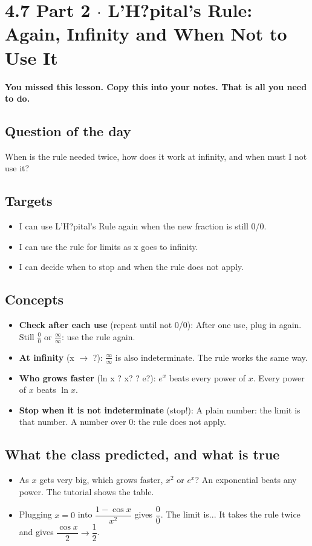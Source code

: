 \documentclass[11pt]{article}
\begin{document}
\section*{4.7 Part 2 $\cdot$ L'H?pital's Rule: Again, Infinity and When Not to Use It}
\textbf{You missed this lesson. Copy this into your notes. That is all you need to do.}\par\medskip
\subsection*{Question of the day}
When is the rule needed twice, how does it work at infinity, and when must I not use it?\par
\subsection*{Targets}\begin{itemize}\item I can use L'H?pital's Rule again when the new fraction is still 0/0.
\item I can use the rule for limits as x goes to infinity.
\item I can decide when to stop and when the rule does not apply.\end{itemize}
\subsection*{Concepts}\begin{itemize}
\item \textbf{Check after each use} (repeat until not 0/0): After one use, plug in again. Still $\frac00$ or $\frac{\infty}{\infty}$: use the rule again.
\item \textbf{At infinity} (x $\rightarrow$ ?): $\frac{\infty}{\infty}$ is also indeterminate. The rule works the same way.
\item \textbf{Who grows faster} (ln x ? x? ? e?): $e^x$ beats every power of $x$. Every power of $x$ beats $\ln x$.
\item \textbf{Stop when it is not indeterminate} (stop!): A plain number: the limit is that number. A number over 0: the rule does not apply.
\end{itemize}
\subsection*{What the class predicted, and what is true}\begin{itemize}
\item As $x$ gets very big, which grows faster, $x^2$ or $e^x$?  An exponential beats any power. The tutorial shows the table.
\item Plugging $x=0$ into $\dfrac{1-\cos x}{x^2}$ gives $\dfrac00$. The limit is...  It takes the rule twice and gives $\dfrac{\cos x}{2}\to\dfrac12$.
\end{itemize}
\end{document}
